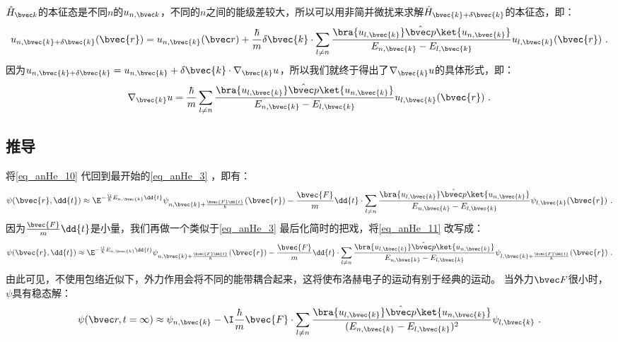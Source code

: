 $\hat H_{\bvec k}$的本征态是不同$n$的$u_{n,\bvec k}$，不同的$n$之间的能级差较大，所以可以用非简并微扰来求解$\hat H_{\bvec{k}+\delta\bvec{k}}$的本征态，即：
\begin{equation}
u_{n,\bvec{k}+\delta\bvec{k}}(\bvec{r})=u_{n,\bvec{k}}(\bvec r)+\frac{\hbar}{m}\delta\bvec{k}\cdot\sum_{l\neq n}\frac{\bra{u_{l,\bvec{k}}}\hat {\bvec p}\ket{u_{n,\bvec{k}}}}{E_{n,\bvec{k}}-E_{l,\bvec{k}}}u_{l,\bvec{k}}(\bvec{r})~.
\end{equation}
因为$u_{n,\bvec{k}+\delta\bvec{k}}=u_{n,\bvec{k}}+\delta \bvec{k}\cdot \nabla_{\bvec{k}} u$，所以我们就终于得出了$\nabla_{\bvec{k}} u$的具体形式，即：
\begin{equation}\label{eq_anHe_10}
\nabla_{\bvec{k}} u = \frac{\hbar}{m}\sum_{l\neq n}\frac{\bra{u_{l,\bvec{k}}}\hat {\bvec p}\ket{u_{n,\bvec{k}}}}{E_{n,\bvec{k}}-E_{l,\bvec{k}}}u_{l,\bvec{k}}(\bvec{r})~.
\end{equation}
\subsection{推导}
将\autoref{eq_anHe_10}  代回到最开始的\autoref{eq_anHe_3}   ，即有：
\begin{equation}\label{eq_anHe_11}
\psi(\bvec{r},\dd{t})\approx \E^{-\frac{\I}{\hbar}E_{n,\bvec{k}}\dd{t}}\psi_{n,\bvec{k}+\frac{\bvec{F}\dd{t}}{\hbar}}(\bvec{r})-\frac{\bvec{F}}{m}\dd{t}\cdot\sum_{l\neq n}\frac{\bra{u_{l,\bvec{k}}}\hat {\bvec p}\ket{u_{n,\bvec{k}}}}{E_{n,\bvec{k}}-E_{l,\bvec{k}}}\psi_{l,\bvec{k}}(\bvec{r})~.
\end{equation}
因为$\frac{\bvec{F}}{m}\dd{t}$是小量，我们再做一个类似于\autoref{eq_anHe_3} 最后化简时的把戏，将\autoref{eq_anHe_11} 改写成：
\begin{equation}
\psi(\bvec{r},\dd{t})\approx \E^{-\frac{\I}{\hbar}E_{n,\bvec{k}}\dd{t}}\psi_{n,\bvec{k}+\frac{\bvec{F}\dd{t}}{\hbar}}(\bvec{r})-\frac{\bvec{F}}{m}\dd{t}\cdot\sum_{l\neq n}\frac{\bra{u_{l,\bvec{k}}}\hat {\bvec p}\ket{u_{n,\bvec{k}}}}{E_{n,\bvec{k}}-E_{l,\bvec{k}}}\psi_{l,\bvec{k}+\frac{\bvec{F}\dd{t}}{\hbar}}(\bvec{r})~.
\end{equation}
由此可见，不使用包络近似下，外力作用会将不同的能带耦合起来，这将使布洛赫电子的运动有别于经典的运动。
当外力$\bvec F$很小时，$\psi$具有稳态解：
\begin{equation}
\psi(\bvec r,t=\infty)\approx\psi_{n,\bvec{k}}-\I\frac{\hbar}{m}\bvec{F}\cdot\sum_{l\neq n}\frac{\bra{u_{l,\bvec{k}}}\hat {\bvec p}\ket{u_{n,\bvec{k}}}}{(E_{n,\bvec{k}}-E_{l,\bvec{k}})^2}\psi_{l,\bvec{k}}~.
\end{equation}

